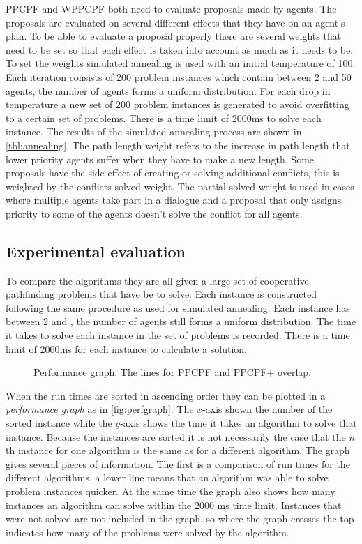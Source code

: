 PPCPF and WPPCPF  both need to evaluate proposals
made by agents. The proposals are evaluated on several different effects that
they have on an agent's plan. To be able to evaluate a proposal properly there
are several weights that need to be set so that each effect is taken into
account as much as it needs to be. To set the weights simulated annealing
\cite{kirkpatrick1983} is used with an initial temperature of 100. Each
iteration consists of 200 problem instances which contain between 2 and 50
agents, the number of agents forms a uniform distribution. For each drop in
temperature a new set of 200 problem instances is generated to avoid
overfitting to a certain set of problems. There is a time limit of 2000ms to
solve each instance. The results of the simulated
annealing process are shown in \autoref{tbl:annealing}. The path length weight
refers to the increase in path length that lower priority agents suffer when
they have to make a new length. Some proposals have the side effect of creating
or solving additional conflicts, this is weighted by the conflicts solved
weight. The partial solved weight is used in cases where multiple agents take
part in a dialogue and a proposal that only assigns priority to some of the
agents doesn't solve the conflict for all agents.

\subsection{Experimental evaluation}
To compare the algorithms they are all given a large set of cooperative
pathfinding problems that have be to solve. Each instance is constructed
following the same procedure as used for simulated annealing. Each instance has
between 2 and \agentsupb, the number of agents still forms a uniform
distribution. The time it takes to solve each instance in the set of problems
is recorded. There is a time limit of 2000ms for each instance to calculate a
solution.

\begin{figure}
	\centering
	
	\caption{Performance graph. The lines for PPCPF and PPCPF+ overlap.}
	\label{fig:perfgraph}
\end{figure}

When the run times are sorted in ascending order they can be plotted
in a \emph{performance graph} as in \autoref{fig:perfgraph}. The $x$-axis shown
the number of the sorted instance while the $y$-axis shows the time it takes an
algorithm to solve that instance. Because the instances are sorted it is not
necessarily the case that the $n$th instance for one algorithm is the same as
for a different algorithm. The graph gives several pieces of information. The
first is a comparison of run times for the different algorithms, a lower line
means that an algorithm was able to solve problem instances quicker. At the
same time the graph also shows how many instances an algorithm can solve within
the 2000 ms time limit. Instances that were not solved are not included in the
graph, so where the graph crosses the top indicates how many of the problems
were solved by the algorithm.

